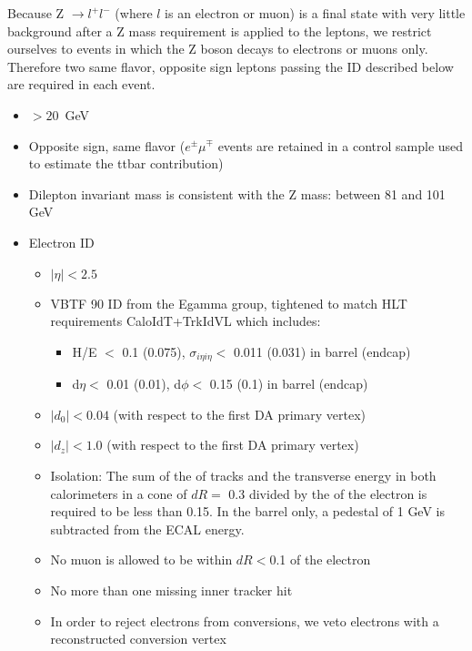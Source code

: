 Because Z $\rightarrow l^+l^-$ (where $l$ is an electron or muon) is a final state with very little background after a Z mass requirement is applied to the leptons,
 we restrict ourselves to events in which the Z boson decays to electrons or muons only.
 Therefore two same flavor, opposite sign leptons passing the ID described below are required in each event. 

\begin{itemize}
\item \pt $> 20$~GeV
\item Opposite sign, same flavor ($e^\pm\mu^\mp$ events are retained in a control sample used to estimate the ttbar contribution)
\item Dilepton invariant mass is consistent with the Z mass: between 81 and 101 GeV


\item Electron ID
  \begin{itemize}
  \item $|\eta| < 2.5$
  \item VBTF 90 ID from the Egamma group\cite{ref:vbtf}, 
	tightened to match HLT requirements CaloIdT+TrkIdVL which includes: \cite{ref:eghlt}
	\begin{itemize}
	\item H/E $<$ 0.1 (0.075), $\sigma_{i\eta i\eta} <$ 0.011 (0.031) in barrel (endcap)
	\item d$\eta <$ 0.01 (0.01), d$\phi <$ 0.15 (0.1) in barrel (endcap)
	\end{itemize}
  \item $|d_0| <0.04$ (with respect to the first DA primary vertex)
  \item $|d_z| <1.0$ (with respect to the first DA primary vertex)
  \item Isolation: The sum of the \pt of tracks and the transverse energy in both calorimeters in a cone of $dR =$ 0.3 divided by the \pt of the electron is required to be less than 0.15. In the barrel only, a pedestal of 1 GeV is subtracted from the ECAL energy.
  \item No muon is allowed to be within $dR < $0.1 of the electron
  \item No more than one missing inner tracker hit \cite{ref:sntconv}
  \item In order to reject electrons from conversions, we veto electrons with a reconstructed conversion vertex \cite{ref:borisconv}


\end{itemize}
\end{itemize}

